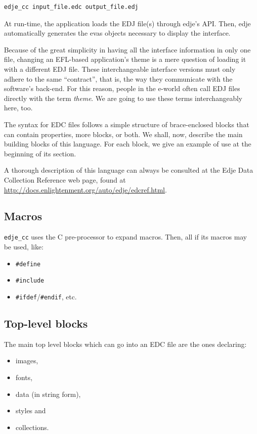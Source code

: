 \documentclass[a4paper]{profusion}
\begin{document}
\begin{verbatim}
edje_cc input_file.edc output_file.edj
\end{verbatim}

At run-time, the application loads the EDJ file(s) through edje's API.
Then, edje automatically generates the evas objects necessary to
display the interface.

Because of the great simplicity in having all the interface
information in only one file, changing an EFL-based application's
theme is a mere question of loading it with a different EDJ
file. These interchangeable interface versions must only adhere to the
same ``contract'', that is, the way they communicate with the
software's back-end. For this reason, people in the e-world often call
EDJ files directly with the term \emph{theme}. We are going to use
these terms interchangeably here, too.

The syntax for EDC files follows a simple structure of brace-enclosed
blocks that can contain properties, more blocks, or both. We shall,
now, describe the main building blocks of this language. For each
block, we give an example of use at the beginning of its section.

A thorough description of this language can always be consulted at the
Edje Data Collection Reference web page, found at \url{
  http://docs.enlightenment.org/auto/edje/edcref.html}.

\subsection{Macros}

\texttt{edje\_cc} uses the C pre-processor to expand macros. Then, all
if its macros may be used, like:
\begin{itemize}
\item \texttt{\#define}
\item \texttt{\#include}
\item \texttt{\#ifdef}/\texttt{\#endif}, etc.
\end{itemize}

\subsection{Top-level blocks}

The main top level blocks which can go into an EDC file are the ones
declaring:
\begin{itemize}
\item images,
\item fonts,
\item data (in string form),
\item styles and
\item collections.
\end{itemize}
\end{document}

